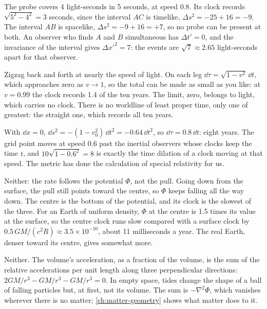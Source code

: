 \begin{checkanswers}
\item[\ref{chk:classify}] The probe covers 4 light-seconds in 5 seconds, at
  speed 0.8. Its clock records $\sqrt{5^{2} - 4^{2}} = 3$ seconds, since the
  interval $AC$ is timelike, $\Delta s^{2} = -25 + 16 = -9$. The interval $AB$
  is spacelike, $\Delta s^{2} = -9 + 16 = +7$, so no probe can be present at
  both. An observer who finds $A$ and $B$ simultaneous has $\Delta t' = 0$, and
  the invariance of the interval gives $\Delta x'^{2} = 7$: the events are
  $\sqrt{7} \approx 2.65$ light-seconds apart for that observer.
\item[\ref{chk:zigzag}] Zigzag back and forth at nearly the speed of light. On
  each leg $\dd\tau = \sqrt{1 - v^{2}}\,\dd t$, which approaches zero as $v \to 1$,
  so the total can be made as small as you like: at $v = 0.99$ the clock
  records 1.4 of the ten years. The limit, zero, belongs to light, which
  carries no clock. There is no worldline of least proper time, only one of
  greatest: the straight one, which records all ten years.
\item[\ref{chk:grid-clock}] With $\dd x = 0$,
  $\dd s^{2} = -(1 - v_{0}^{2})\,\dd t^{2} = -0.64\,\dd t^{2}$, so
  $\dd\tau = 0.8\,\dd t$: eight years. The grid point moves at speed 0.6 past
  the inertial observers whose clocks keep the time $t$, and
  $10\sqrt{1 - 0.6^{2}} = 8$ is exactly the time dilation of a clock moving at
  that speed. The metric has done the calculation of special relativity for
  us.
\item[\ref{chk:earth-centre}] Neither: the rate follows the potential $\Phi$,
  not the pull. Going down from the surface, the pull still points toward the
  centre, so $\Phi$ keeps falling all the way down. The centre is the bottom of
  the potential, and its clock is the slowest of the three. For an Earth of
  uniform density, $\Phi$ at the centre is 1.5 times its value at the surface,
  so the centre clock runs slow compared with a surface clock by
  $0.5\,GM/(c^{2}R) \approx 3.5\times10^{-10}$, about 11 milliseconds a year.
  The real Earth, denser toward its centre, gives somewhat more.
\item[\ref{chk:tidal-volume}] Neither. The volume's acceleration, as a
  fraction of the volume, is the sum of the relative accelerations per unit
  length along three perpendicular directions:
  $2GM/r^{3} - GM/r^{3} - GM/r^{3} = 0$. In empty space, tides change the shape
  of a ball of falling particles but, at first, not its volume. The sum is
  $-\nabla^{2}\Phi$, which vanishes wherever there is no matter;
  \cref{ch:matter-geometry} shows what matter does to it.
\end{checkanswers}

